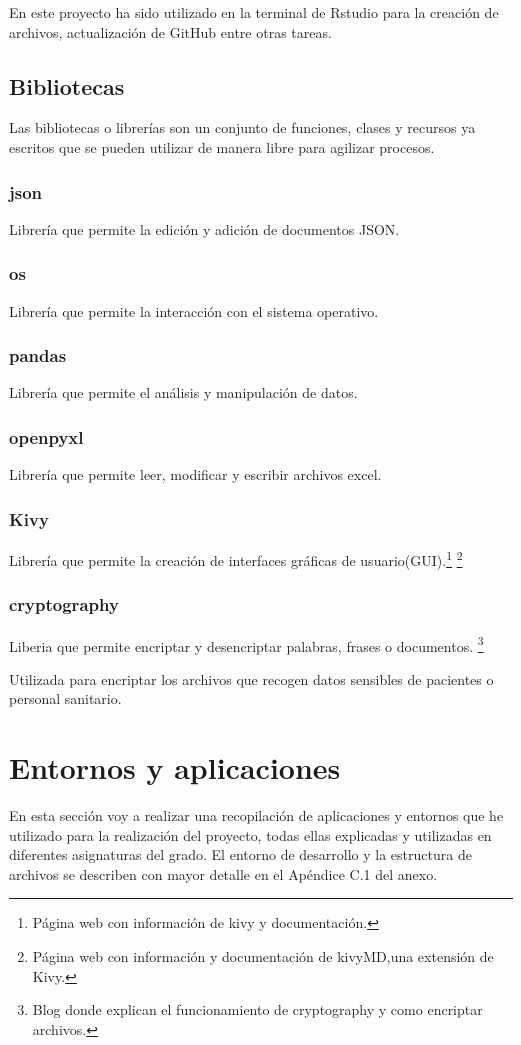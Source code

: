 En este proyecto ha sido utilizado en la terminal de Rstudio para la creación de archivos, actualización de GitHub entre otras tareas.

\subsection{Bibliotecas}
Las bibliotecas o librerías son un conjunto de funciones, clases y recursos ya escritos que se pueden utilizar de manera libre para agilizar procesos. 
\subsubsection{json}
Librería que permite la edición y adición de documentos JSON.
\subsubsection{os}
Librería que permite la interacción con el sistema operativo.
\subsubsection{pandas}
Librería que permite el análisis y manipulación de datos.
\subsubsection{openpyxl}
Librería que permite leer, modificar y escribir archivos excel.
\subsubsection{Kivy}
Librería que permite la creación de interfaces gráficas de usuario(GUI).\cite{kivy}\footnote{Página web con información de kivy y documentación\cite{kivy}.}
\cite{KivyMD}\footnote{Página web con información y documentación de kivyMD,una extensión de Kivy\cite{KivyMD}.}
\subsubsection{cryptography}

Liberia que permite encriptar y desencriptar palabras, frases o documentos. \cite{ruh_encriptar_2023}\footnote{Blog donde explican el funcionamiento de cryptography y como encriptar archivos\cite{ruh_encriptar_2023}.}

Utilizada para encriptar los archivos que recogen datos sensibles de pacientes o personal sanitario.
\section{Entornos y aplicaciones}
En esta sección voy a realizar una recopilación de aplicaciones y entornos que he utilizado para la realización del proyecto, todas ellas explicadas y utilizadas en diferentes asignaturas del grado. El entorno de desarrollo y la estructura de archivos se describen con mayor detalle en el Apéndice C.1 del anexo.
